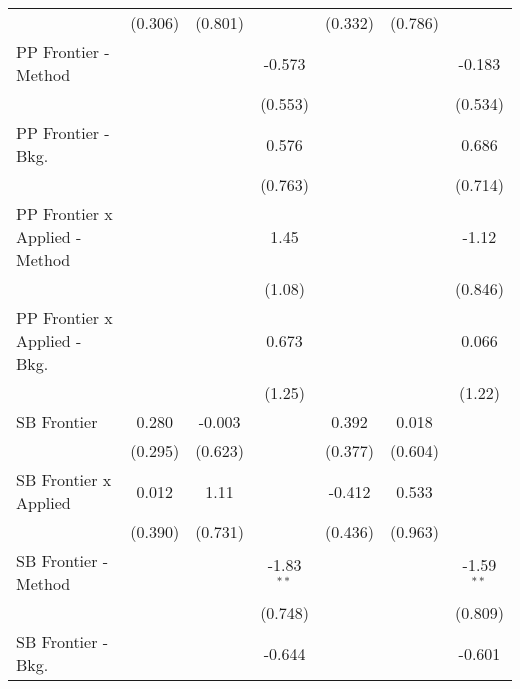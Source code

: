 \begin{tabular}{lcccccc}
                                  & (0.306)      & (0.801)       &               & (0.332)       & (0.786)       &   \\   
   PP Frontier - Method           &              &               & -0.573        &               &               & -0.183\\   
                                  &              &               & (0.553)       &               &               & (0.534)\\   
   PP Frontier - Bkg.             &              &               & 0.576         &               &               & 0.686\\   
                                  &              &               & (0.763)       &               &               & (0.714)\\   
   PP Frontier x Applied - Method &              &               & 1.45          &               &               & -1.12\\   
                                  &              &               & (1.08)        &               &               & (0.846)\\   
   PP Frontier x Applied - Bkg.   &              &               & 0.673         &               &               & 0.066\\   
                                  &              &               & (1.25)        &               &               & (1.22)\\   
   SB Frontier                    & 0.280        & -0.003        &               & 0.392         & 0.018         &   \\   
                                  & (0.295)      & (0.623)       &               & (0.377)       & (0.604)       &   \\   
   SB Frontier x Applied          & 0.012        & 1.11          &               & -0.412        & 0.533         &   \\   
                                  & (0.390)      & (0.731)       &               & (0.436)       & (0.963)       &   \\   
   SB Frontier - Method           &              &               & -1.83$^{**}$  &               &               & -1.59$^{**}$\\   
                                  &              &               & (0.748)       &               &               & (0.809)\\   
   SB Frontier - Bkg.             &              &               & -0.644        &               &               & -0.601\\   

\end{tabular}
